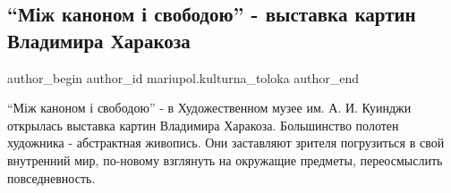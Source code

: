  
 
 
 
 

\subsection{\enquote{Між каноном і свободою} - выставка картин Владимира Харакоза}
\label{sec:18_01_2019.fb.mariupol.kulturna_toloka.2.vystavka_vladimir_harakoz_mizh_kanonom_i_svobodoju}

\ifcmt
 author_begin
   author_id mariupol.kulturna_toloka
 author_end
\fi

\enquote{Між каноном і свободою} - в Художественном музее им. А. И. Куинджи открылась
выставка картин Владимира Харакоза. Большинство полотен художника - абстрактная
живопись. Они заставляют зрителя погрузиться в свой внутренний мир, по-новому
взглянуть на окружащие предметы, переосмыслить повседневность.

